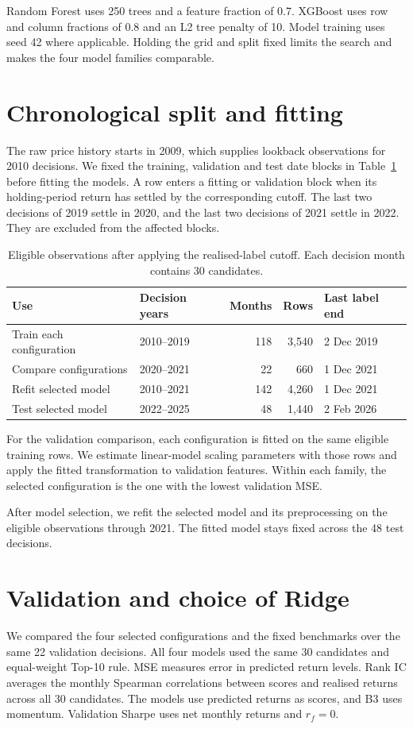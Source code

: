 \documentclass[11pt,a4paper]{article}
\newcommand{\rfzero}{\(r_f=0\)}
\begin{document}
Random Forest uses 250 trees and a feature fraction of 0.7. XGBoost uses row and column fractions of 0.8 and an L2 tree penalty of 10. Model training uses seed 42 where applicable. Holding the grid and split fixed limits the search and makes the four model families comparable.

\clearpage
\section{Chronological split and fitting}
\label{sec:split}
The raw price history starts in 2009, which supplies lookback observations for 2010 decisions. We fixed the training, validation and test date blocks in Table~\ref{tab:split} before fitting the models. A row enters a fitting or validation block when its holding-period return has settled by the corresponding cutoff. The last two decisions of 2019 settle in 2020, and the last two decisions of 2021 settle in 2022. They are excluded from the affected blocks.

\begin{table}[H]
\centering
\begin{tabular}{llrrl}
\toprule
Use & Decision years & Months & Rows & Last label end \\
\midrule
Train each configuration & 2010--2019 & 118 & 3,540 & 2 Dec 2019 \\
Compare configurations & 2020--2021 & 22 & 660 & 1 Dec 2021 \\
Refit selected model & 2010--2021 & 142 & 4,260 & 1 Dec 2021 \\
Test selected model & 2022--2025 & 48 & 1,440 & 2 Feb 2026 \\
\bottomrule
\end{tabular}
\caption{Eligible observations after applying the realised-label cutoff. Each decision month contains 30 candidates.}
\label{tab:split}
\end{table}

For the validation comparison, each configuration is fitted on the same eligible training rows. We estimate linear-model scaling parameters with those rows and apply the fitted transformation to validation features. Within each family, the selected configuration is the one with the lowest validation MSE.

After model selection, we refit the selected model and its preprocessing on the eligible observations through 2021. The fitted model stays fixed across the 48 test decisions.

\clearpage
\section{Validation and choice of Ridge}
\label{sec:validation}
We compared the four selected configurations and the fixed benchmarks over the same 22 validation decisions. All four models used the same 30 candidates and equal-weight Top-10 rule. MSE measures error in predicted return levels. Rank IC averages the monthly Spearman correlations between scores and realised returns across all 30 candidates. The models use predicted returns as scores, and B3 uses momentum. Validation Sharpe uses net monthly returns and \rfzero.
\end{document}
